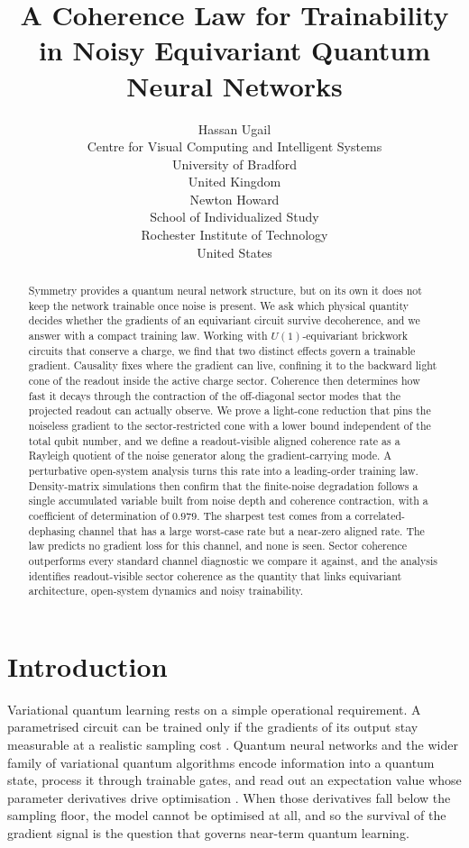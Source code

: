\documentclass{article}
\title{A Coherence Law for Trainability in Noisy Equivariant Quantum Neural Networks}
\author{
  Hassan Ugail \\
  Centre for Visual Computing and Intelligent Systems \\
  University of Bradford \\
  United Kingdom \\
  \And
  Newton Howard \\
  School of Individualized Study \\
  Rochester Institute of Technology \\
  United States \\
}
\begin{document}
\maketitle

\begin{abstract}
Symmetry provides a quantum neural network structure, but on its own it does not keep the network trainable once noise is present. We ask which physical quantity decides whether the gradients of an equivariant circuit survive decoherence, and we answer with a compact training law. Working with $U(1)$-equivariant brickwork circuits that conserve a charge, we find that two distinct effects govern a trainable gradient. Causality fixes where the gradient can live, confining it to the backward light cone of the readout inside the active charge sector. Coherence then determines how fast it decays through the contraction of the off-diagonal sector modes that the projected readout can actually observe. We prove a light-cone reduction that pins the noiseless gradient to the sector-restricted cone with a lower bound independent of the total qubit number, and we define a readout-visible aligned coherence rate as a Rayleigh quotient of the noise generator along the gradient-carrying mode. A perturbative open-system analysis turns this rate into a leading-order training law. Density-matrix simulations then confirm that the finite-noise degradation follows a single accumulated variable built from noise depth and coherence contraction, with a coefficient of determination of $0.979$. The sharpest test comes from a correlated-dephasing channel that has a large worst-case rate but a near-zero aligned rate. The law predicts no gradient loss for this channel, and none is seen. Sector coherence outperforms every standard channel diagnostic we compare it against, and the analysis identifies readout-visible sector coherence as the quantity that links equivariant architecture, open-system dynamics and noisy trainability.
\end{abstract}


\section{Introduction}\label{sec:intro}

Variational quantum learning rests on a simple operational requirement. A parametrised circuit can be trained only if the gradients of its output stay measurable at a realistic sampling cost \cite{biamonte2017,preskill2018,cerezo2021review,mitarai2018}. Quantum neural networks and the wider family of variational quantum algorithms encode information into a quantum state, process it through trainable gates, and read out an expectation value whose parameter derivatives drive optimisation \cite{havlicek2019,schuld2021,abbas2021}. When those derivatives fall below the sampling floor, the model cannot be optimised at all, and so the survival of the gradient signal is the question that governs near-term quantum learning.
\end{document}

